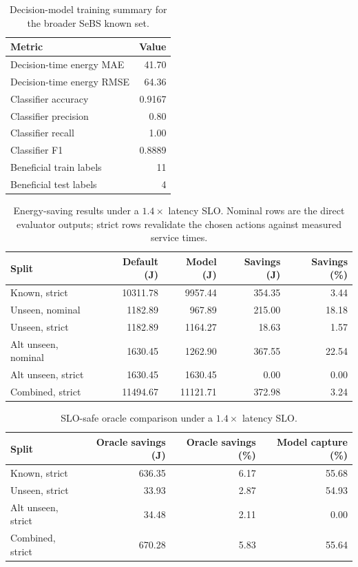 
\begin{table}[t]
\centering
\caption{Decision-model training summary for the broader SeBS known set.}
\label{tab:slo14-model-summary}
\begin{tabular}{lr}
\toprule
Metric & Value \\
\midrule
Decision-time energy MAE & 41.70 \\
Decision-time energy RMSE & 64.36 \\
Classifier accuracy & 0.9167 \\
Classifier precision & 0.80 \\
Classifier recall & 1.00 \\
Classifier F1 & 0.8889 \\
Beneficial train labels & 11 \\
Beneficial test labels & 4 \\
\bottomrule
\end{tabular}
\end{table}

\begin{table}[t]
\centering
\caption{Energy-saving results under a $1.4\times$ latency SLO. Nominal rows are the direct evaluator outputs; strict rows revalidate the chosen actions against measured service times.}
\label{tab:slo14-energy-results}
\begin{tabular}{lrrrr}
\toprule
Split & Default (J) & Model (J) & Savings (J) & Savings (\%) \\
\midrule
Known, strict & 10311.78 & 9957.44 & 354.35 & 3.44 \\
Unseen, nominal & 1182.89 & 967.89 & 215.00 & 18.18 \\
Unseen, strict & 1182.89 & 1164.27 & 18.63 & 1.57 \\
Alt unseen, nominal & 1630.45 & 1262.90 & 367.55 & 22.54 \\
Alt unseen, strict & 1630.45 & 1630.45 & 0.00 & 0.00 \\
Combined, strict & 11494.67 & 11121.71 & 372.98 & 3.24 \\
\bottomrule
\end{tabular}
\end{table}

\begin{table}[t]
\centering
\caption{SLO-safe oracle comparison under a $1.4\times$ latency SLO.}
\label{tab:slo14-oracle-comparison}
\begin{tabular}{lrrr}
\toprule
Split & Oracle savings (J) & Oracle savings (\%) & Model capture (\%) \\
\midrule
Known, strict & 636.35 & 6.17 & 55.68 \\
Unseen, strict & 33.93 & 2.87 & 54.93 \\
Alt unseen, strict & 34.48 & 2.11 & 0.00 \\
Combined, strict & 670.28 & 5.83 & 55.64 \\
\bottomrule
\end{tabular}
\end{table}

